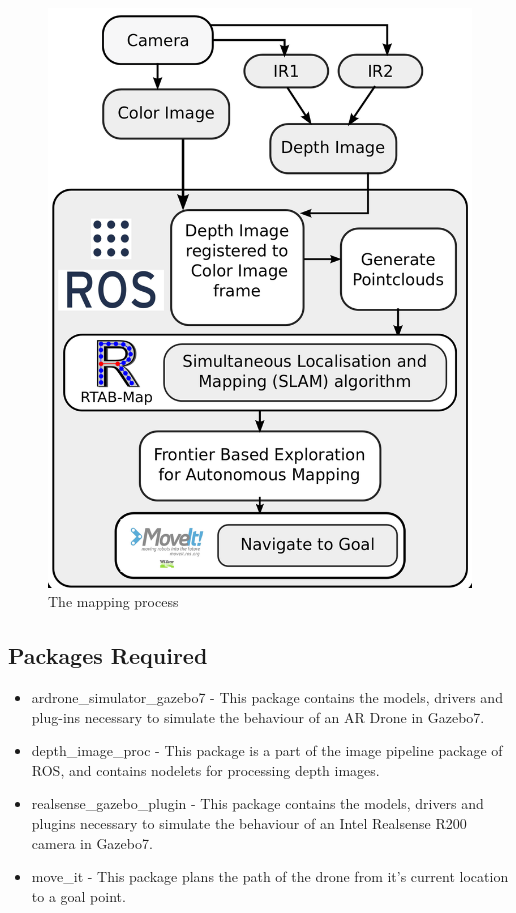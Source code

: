 \documentclass[a4paper,12pt,oneside]{book}
\begin{document}
\begin{figure}[h]
	\centering
	\includegraphics[scale=0.27]{process}
	\caption{The mapping process}
\end{figure}

\subsection*{Packages Required}
\begin{itemize}
	\item ardrone\_simulator\_gazebo7 - This package contains the models, drivers and plug-ins necessary to simulate the behaviour of an AR Drone in Gazebo7. 

	\item depth\_image\_proc - This package is a part of the image pipeline package of ROS, and contains nodelets for processing depth images.
		
	\item realsense\_gazebo\_plugin	- This package contains the models, drivers and plugins necessary to simulate the behaviour of an Intel Realsense R200 camera in Gazebo7.
		
	\item move\_it - This package plans the path of the drone from it's current location to a goal point.		
		
\end{itemize}
\end{document}
